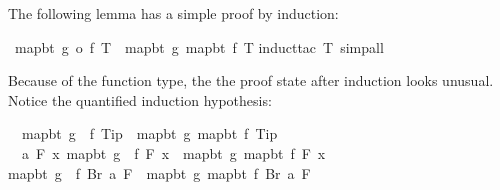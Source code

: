 \begin{isabellebody}
\begin{isamarkuptext}
The following lemma has a simple proof by induction:%
\end{isamarkuptext}%
\ {\isachardoublequote}map{\isacharunderscore}bt\ {\isacharparenleft}g\ o\ f{\isacharparenright}\ T\ {\isacharequal}\ map{\isacharunderscore}bt\ g\ {\isacharparenleft}map{\isacharunderscore}bt\ f\ T{\isacharparenright}{\isachardoublequote}\isanewline
{}induct{\isacharunderscore}tac\ T{\isacharcomma}\ simp{\isacharunderscore}all{\isacharparenright}\isanewline
{}%
\begin{isamarkuptxt}%
\noindent
Because of the function type, the 
the proof state after induction looks unusual.
Notice the quantified induction hypothesis:
\begin{isabelle}%
\ {}{\isachardot}\ map{\isacharunderscore}bt\ {\isacharparenleft}g\ {\isasymcirc}\ f{\isacharparenright}\ Tip\ {\isacharequal}\ map{\isacharunderscore}bt\ g\ {\isacharparenleft}map{\isacharunderscore}bt\ f\ Tip{\isacharparenright}\isanewline
\ {}{\isachardot}\ {\isasymAnd}a\ F{\isachardot}\ {\isacharparenleft}{\isasymAnd}x{\isachardot}\ map{\isacharunderscore}bt\ {\isacharparenleft}g\ {\isasymcirc}\ f{\isacharparenright}\ {\isacharparenleft}F\ x{\isacharparenright}\ {\isacharequal}\ map{\isacharunderscore}bt\ g\ {\isacharparenleft}map{\isacharunderscore}bt\ f\ {\isacharparenleft}F\ x{\isacharparenright}{\isacharparenright}{\isacharparenright}\ {\isasymLongrightarrow}\isanewline
{}map{\isacharunderscore}bt\ {\isacharparenleft}g\ {\isasymcirc}\ f{\isacharparenright}\ {\isacharparenleft}Br\ a\ F{\isacharparenright}\ {\isacharequal}\ map{\isacharunderscore}bt\ g\ {\isacharparenleft}map{\isacharunderscore}bt\ f\ {\isacharparenleft}Br\ a\ F{\isacharparenright}{\isacharparenright}%
\end{isabelle}%
\end{isamarkuptxt}%
\end{isabellebody}%
